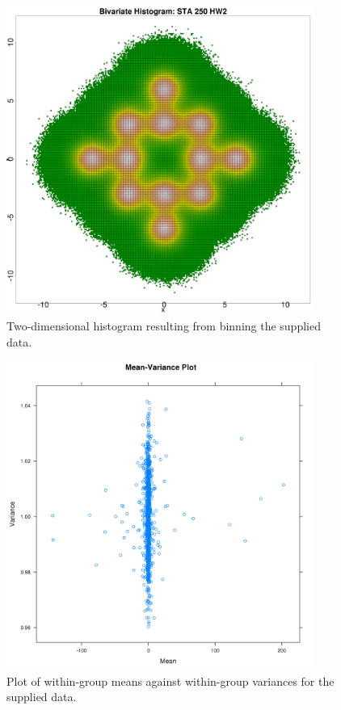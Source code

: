     \begin{figure}[p]
    \includegraphics[width = 0.9\textwidth]{res/hist2d.png}
    \caption{
    Two-dimensional histogram resulting from binning the supplied data.
    }
    \label{fig:hist}
    \end{figure}

    \begin{figure}[p]
    \includegraphics[width = 0.9\textwidth]{res/03_mean_var_plot.png}
    \caption{
    Plot of within-group means against within-group variances for the 
    supplied data.
    }
    \label{fig:mean-var}
    \end{figure}


